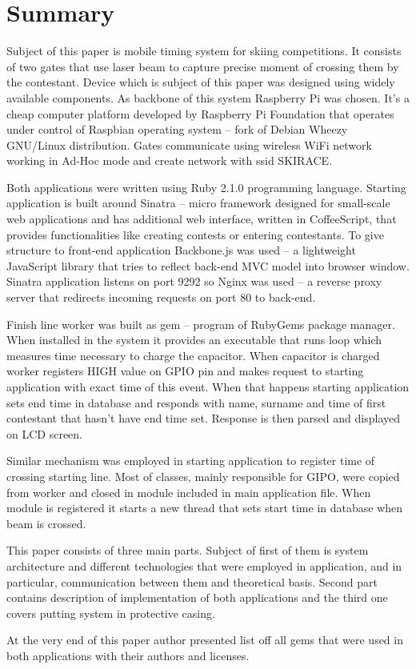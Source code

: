 \documentclass[11pt,a4paper, twoside]{article}
\begin{document}
\section{Summary}
	Subject of this paper is mobile timing system for skiing competitions. It consists of two gates that use laser beam to capture precise moment of crossing them by the contestant. Device which is subject of this paper was designed using widely available components. As backbone of this system  Raspberry Pi was chosen. It's a cheap computer platform developed by Raspberry Pi Foundation that operates under control of Raspbian operating system – fork of Debian Wheezy GNU/Linux distribution.  Gates communicate using wireless WiFi network working in Ad-Hoc mode and create network with ssid SKIRACE.
	
	Both applications were written using Ruby 2.1.0 programming language. Starting application is built around Sinatra – micro framework designed for small-scale web applications and has additional web interface, written in CoffeeScript, that provides functionalities like creating contests or entering contestants. To give structure to  front-end application Backbone.js was used – a lightweight JavaScript library that tries to reflect back-end  MVC model into browser window.  Sinatra application listens on port 9292 so Nginx was used – a reverse proxy server that redirects incoming requests on port 80 to back-end.
	
	Finish line worker was built as gem – program of RubyGems package manager. When installed in the system it provides an executable that runs  loop which measures time necessary to charge the capacitor. When capacitor is charged worker registers HIGH value on GPIO pin and makes request to starting application with exact time of this event. When that happens starting application sets end time in database and responds with name, surname and time of first contestant that hasn't have end time set. Response is then parsed and displayed on  LCD  screen.
	
	Similar mechanism was employed in starting application to register time of crossing starting line. Most of classes, mainly responsible for GIPO, were copied from worker and closed in module included in main application file. When module is registered it starts a new thread that sets start time in database when beam  is crossed.
	
	This paper consists of three main parts. Subject of first of them is system architecture and different technologies that were employed in application, and in particular, communication between them and theoretical basis. Second part contains description of implementation of both applications and the third one covers putting system in protective casing.
	
	At the very end of this paper author presented list off all gems that were used in both applications with their authors and licenses.
\end{document}
